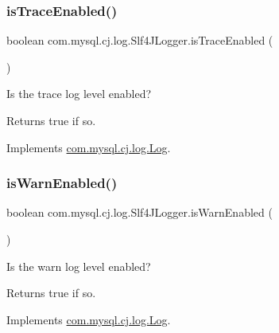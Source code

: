 \subsubsection{\texorpdfstring{is\+Trace\+Enabled()}{isTraceEnabled()}}
{\footnotesize\ttfamily boolean com.\+mysql.\+cj.\+log.\+Slf4\+J\+Logger.\+is\+Trace\+Enabled (\begin{DoxyParamCaption}{ }\end{DoxyParamCaption})}

Is the \textquotesingle{}trace\textquotesingle{} log level enabled?

\begin{DoxyReturn}{Returns}
true if so. 
\end{DoxyReturn}


Implements \mbox{\hyperlink{interfacecom_1_1mysql_1_1cj_1_1log_1_1_log_a814070e176d987da656b45662bc63ccd}{com.\+mysql.\+cj.\+log.\+Log}}.

\mbox{\label{classcom_1_1mysql_1_1cj_1_1log_1_1_slf4_j_logger_aaf12f87af0d37c01118649ba65220a69}} 
\subsubsection{\texorpdfstring{is\+Warn\+Enabled()}{isWarnEnabled()}}
{\footnotesize\ttfamily boolean com.\+mysql.\+cj.\+log.\+Slf4\+J\+Logger.\+is\+Warn\+Enabled (\begin{DoxyParamCaption}{ }\end{DoxyParamCaption})}

Is the \textquotesingle{}warn\textquotesingle{} log level enabled?

\begin{DoxyReturn}{Returns}
true if so. 
\end{DoxyReturn}


Implements \mbox{\hyperlink{interfacecom_1_1mysql_1_1cj_1_1log_1_1_log_a7877db04f22a78b801a8f2f8989d7043}{com.\+mysql.\+cj.\+log.\+Log}}.

\mbox{\label{classcom_1_1mysql_1_1cj_1_1log_1_1_slf4_j_logger_aef79b4ff2ba3058fe4f713db62707e6c}} 
